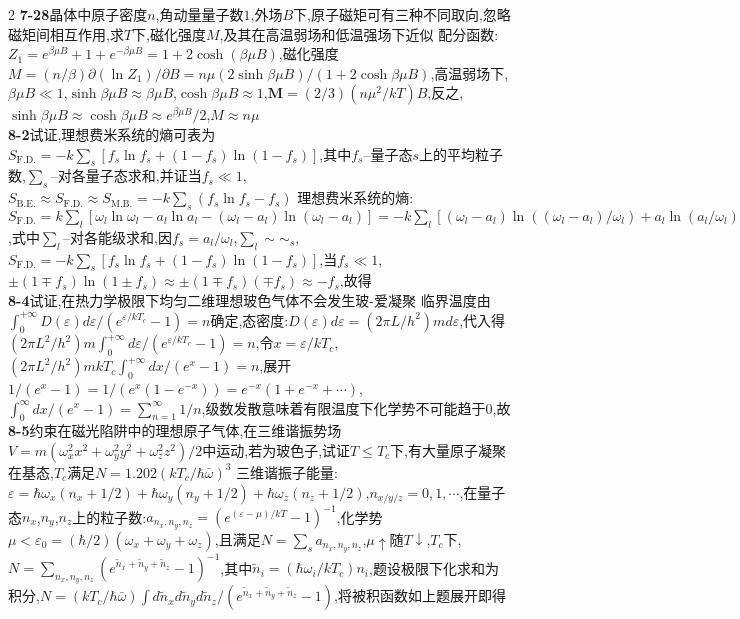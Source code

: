\documentclass[10pt,a4paper]{article}
\begin{document}
\begin{multicols}{2}
\textbf{7-28}晶体中原子密度$n$,角动量量子数$1$,外场$B$下,原子磁矩可有三种不同取向,忽略磁矩间相互作用,求$T$下,磁化强度$M$,及其在高温弱场和低温强场下近似\quad\quad
配分函数:$Z_1=e^{\beta\mu B}+1+e^{-\beta\mu B}=1+2\cosh(\beta\mu B)$,磁化强度$M=(n/\beta)\partial(\ln Z_1)/\partial B=n\mu(2\sinh\beta\mu B)/(1+2\cosh\beta\mu B)$,高温弱场下,$\beta\mu B\ll1$,$\sinh\beta\mu B\approx\beta\mu B$,$\cosh\beta\mu B\approx1$,$\bm{M}=(2/3)(n\mu^2/kT)B$,反之,$\sinh\beta\mu B\approx\cosh\beta\mu B\approx e^{\beta\mu B}/2$,$M\approx n\mu$\\
\textbf{8-2}试证,理想费米系统的熵可表为$S_{\text{F.D.}}=-k\sum_s[f_s\ln f_s+(1-f_s)\ln(1-f_s)]$,其中$f_s$--量子态$s$上的平均粒子数,$\sum_s$--对各量子态求和,并证当$f_s\ll1$,$S_{\text{B.E.}}\approx S_{\text{F.D.}}\approx S_{\text{M.B.}}=-k\sum_s(f_s\ln f_s-f_s)$\quad\quad
理想费米系统的熵:$S_{\text{F.D.}}=k\sum_l[\omega_l\ln\omega_l-a_l\ln a_l-(\omega_l-a_l)\ln(\omega_l-a_l)]=-k\sum_l[(\omega_l-a_l)\ln((\omega_l-a_l)/\omega_l)+a_l\ln(a_l/\omega_l)]=-k\sum_l\omega_l[(1-a_l/\omega_l)\ln(1-a_l/\omega_l)-(a_l/\omega_l)\ln(a_l/\omega_l)]$,式中$\sum_l$--对各能级求和,因$f_s=a_l/\omega_l$,$\sum_l\sim\sim_s$,$S_{\text{F.D.}}=-k\sum_s[f_s\ln f_s+(1-f_s)\ln(1-f_s)]$,当$f_s\ll1$,$\pm(1\mp f_s)\ln(1\pm f_s)\approx\pm(1\mp f_s)(\mp f_s)\approx-f_s$,故得\\
\textbf{8-4}试证,在热力学极限下均匀二维理想玻色气体不会发生玻-爱凝聚\quad\quad
临界温度由$\int_0^{+\infty}D(\varepsilon)d\varepsilon/(e^{\varepsilon/kT_c}-1)=n$确定,态密度:$D(\varepsilon)d\varepsilon=(2\pi L/h^2)md\varepsilon$,代入得$(2\pi L^2/h^2)m\int_0^{+\infty}d\varepsilon/(e^{\varepsilon/kT_c}-1)=n$,令$x=\varepsilon/kT_c$,$(2\pi L^2/h^2)mkT_c\int_0^{+\infty}dx/(e^x-1)=n$,展开$1/(e^x-1)=1/(e^x(1-e^{-x}))=e^{-x}(1+e^{-x}+\cdots)$,$\int_0^{\infty}dx/(e^x-1)=\sum_{n=1}^{\infty}1/n$,级数发散意味着有限温度下化学势不可能趋于$0$,故\\
\textbf{8-5}约束在磁光陷阱中的理想原子气体,在三维谐振势场$V=m(\omega_x^2x^2+\omega_y^2y^2+\omega_z^2z^2)/2$中运动,若为玻色子,试证$T\leq T_c$下,有大量原子凝聚在基态,$T_c$满足$N=1.202(kT_c/\hbar\bar{\omega})^3$\quad\quad
三维谐振子能量:$\varepsilon=\hbar\omega_x(n_x+1/2)+\hbar\omega_y(n_y+1/2)+\hbar\omega_z(n_z+1/2)$,$n_{x/y/z}=0,1,\cdots$,在量子态$n_x$,$n_y$,$n_z$上的粒子数:$a_{n_x,n_y,n_z}=(e^{(\varepsilon-\mu)/kT}-1)^{-1}$,化学势$\mu<\varepsilon_0=(\hbar/2)(\omega_x+\omega_y+\omega_z)$,且满足$N=\sum_sa_{n_x,n_y,n_z}$,$\mu\uparrow$随$T\downarrow$,$T_c$下,$N=\sum_{n_x,n_y,n_z}(e^{\tilde{n}_x+\tilde{n}_y+\tilde{n}_z}-1)^{-1}$,其中$\tilde{n}_i=(\hbar\omega_i/kT_c)n_i$,题设极限下化求和为积分,$N=(kT_c/\hbar\bar{\omega})\int d\tilde{n}_xd\tilde{n}_yd\tilde{n}_z/(e^{\tilde{n}_x+\tilde{n}_y+\tilde{n}_z}-1)$,将被积函数如上题展开即得\\

\end{multicols}
\end{document}
